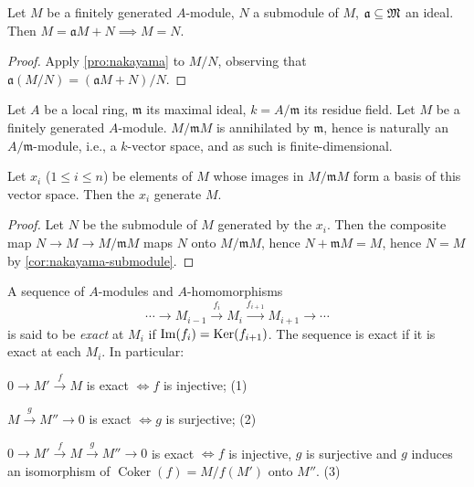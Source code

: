 \begin{corollary}\label{cor:nakayama-submodule}
    Let $M$ be a finitely generated $A$-module, $N$ a submodule of $M$, $\mathfrak{a} \subseteq \mathfrak{M}$ an ideal. Then $M = \mathfrak{a}M + N \implies M = N$.
\end{corollary}

\begin{proof}
    Apply \eqref{pro:nakayama} to $M/N$, observing that $\mathfrak{a}(M/N) = (\mathfrak{a}M + N)/N$.
\end{proof}

Let $A$ be a local ring, $\mathfrak{m}$ its maximal ideal, $k = A/\mathfrak{m}$ its residue field. Let $M$ be a finitely generated $A$-module. $M/\mathfrak{m}M$ is annihilated by $\mathfrak{m}$, hence is naturally an $A/\mathfrak{m}$-module, i.e., a $k$-vector space, and as such is finite-dimensional.

\begin{proposition}\label{prop:generate-modulo-maximal}
Let $x_i$ ($1 \leq i \leq n$) be elements of $M$ whose images in $M/\mathfrak{m}M$ form a basis of this vector space. Then the $x_i$ generate $M$.
\end{proposition}

\begin{proof}
Let $N$ be the submodule of $M$ generated by the $x_i$. Then the composite map $N \to M \to M/\mathfrak{m}M$ maps $N$ onto $M/\mathfrak{m}M$, hence $N + \mathfrak{m}M = M$, hence $N = M$ by \eqref{cor:nakayama-submodule}.
\end{proof}


A sequence of $A$-modules and $A$-homomorphisms
\[
    \cdots \to M_{i-1} \stackrel{f_i}{\longrightarrow} M_i \stackrel{f_{i+1}}{\longrightarrow} M_{i+1} \longrightarrow \cdots \tag{0}
\]
is said to be \emph{exact} at $M_i$ if $\operatorname{Im}(f_i) = \operatorname{Ker}(f_{i+1})$. The sequence is exact if it is exact at each $M_i$. In particular:

$0 \longrightarrow M' \stackrel{f}{\longrightarrow} M$ is exact $\iff f$ is injective; \hfill (1)

$M \stackrel{g}{\longrightarrow} M'' \longrightarrow 0$ is exact $\iff g$ is surjective; \hfill (2)

$0 \longrightarrow M' \stackrel{f}{\longrightarrow} M \stackrel{g}{\longrightarrow} M'' \longrightarrow 0$ is exact $\iff f$ is injective, $g$ is surjective and $g$ induces an isomorphism of $\operatorname{Coker}(f) = M/f(M')$ onto $M''$. \hfill (3)

